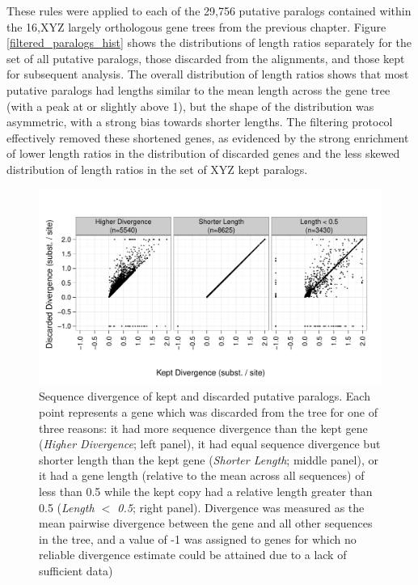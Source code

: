 These rules were applied to each of the 29,756 putative paralogs
contained within the 16,XYZ largely orthologous gene trees from the
previous chapter. Figure \ref{filtered_paralogs_hist} shows the
distributions of length ratios separately for the set of all putative
paralogs, those discarded from the alignments, and those kept for
subsequent analysis. The overall distribution of length ratios shows
that most putative paralogs had lengths similar to the mean length
across the gene tree (with a peak at or slightly above 1), but the
shape of the distribution was asymmetric, with a strong bias towards
shorter lengths. The filtering protocol effectively removed these
shortened genes, as evidenced by the strong enrichment of lower length
ratios in the distribution of discarded genes and the less skewed
distribution of length ratios in the set of XYZ kept paralogs.

\begin{figure}
\centering
\includegraphics[scale=0.7]{Figs/filtered_paralogs_scatter.pdf}
\caption{Sequence divergence of kept and discarded putative
  paralogs. Each point represents a gene which was discarded from the
  tree for one of three reasons: it had more sequence divergence than
  the kept gene (\emph{Higher Divergence}; left panel), it had equal
  sequence divergence but shorter length than the kept gene
  (\emph{Shorter Length}; middle panel), or it had a gene length
  (relative to the mean across all sequences) of less than 0.5 while
  the kept copy had a relative length greater than 0.5 (\emph{Length
    $<$ 0.5}; right panel). Divergence was measured as the mean
  pairwise divergence between the gene and all other sequences in the
  tree, and a value of -1 was assigned to genes for which no reliable
  divergence estimate could be attained due to a lack of sufficient
  data)}
\label{filtered_paralogs_scatter}
\end{figure}

